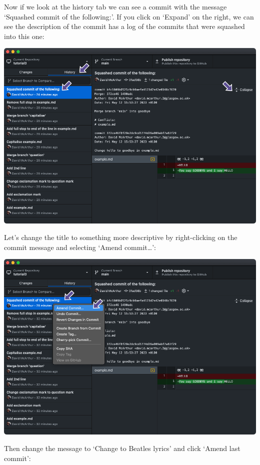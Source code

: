 \documentclass[
  letterpaper,
  DIV=11,
  numbers=noendperiod]{scrartcl}
\begin{document}
Now if we look at the history tab we can see a commit with the message
`Squashed commit of the following:'. If you click on `Expand' on the
right, we can see the description of the commit has a log of the commits
that were squashed into this one:

\includegraphics{images/image73.png}

Let's change the title to something more descriptive by right-clicking
on the commit message and selecting `Amend commit\ldots{}':

\includegraphics{images/image74.png}

Then change the message to `Change to Beatles lyrics' and click `Amend
last commit':
\end{document}
